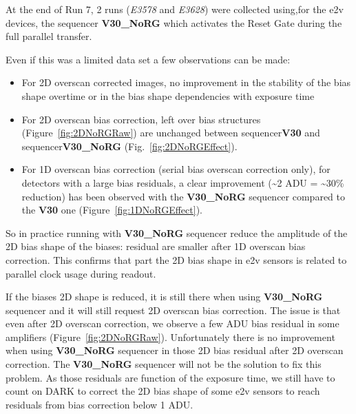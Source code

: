 At the end of Run 7, 2 runs ({\it E3578} and {\it E3628}) were collected using,for the e2v devices, the  sequencer {\bf V30\_NoRG}  which activates the Reset Gate during the full parallel transfer. 

Even if this was a limited data set a few observations can be made: 
\begin{itemize}
    \item For 2D overscan corrected images, no improvement in the stability of the bias shape overtime  or in the bias shape dependencies with exposure time   
    \item For 2D overscan bias correction, left over bias structures (Figure~\ref{fig:2DNoRGRaw}) are unchanged between  sequencer{\bf V30} and sequencer{\bf V30\_NoRG} (Fig.~\ref{fig:2DNoRGEffect}).
    \item For 1D overscan bias correction (serial bias overscan correction only), for detectors with a large  bias residuals, a clear improvement (\textasciitilde2 ADU = \textasciitilde 30\% reduction) has been observed with the {\bf V30\_NoRG} sequencer compared to the {\bf V30} one (Figure~\ref{fig:1DNoRGEffect}). 
\end{itemize}

So in practice running with {\bf V30\_NoRG} sequencer reduce the amplitude of the 2D bias shape of the biases: residual are smaller after 1D overscan bias correction.  This confirms  that part the 2D bias shape in e2v sensors is related to parallel clock usage during readout. 

If the biases 2D shape is reduced, it is still there when using {\bf V30\_NoRG} sequencer and it will still request 2D overscan bias correction. The issue is that even after 2D overscan correction, we observe a few ADU bias residual in some amplifiers (Figure~\ref{fig:2DNoRGRaw}). Unfortunately there is no improvement when using  {\bf V30\_NoRG} sequencer in those 2D bias residual after 2D overscan correction. The {\bf V30\_NoRG} sequencer will not be the solution to fix this problem. As those residuals are function of the exposure time, we still have to count on DARK to correct the 2D bias shape of some e2v sensors to reach residuals from bias correction below 1 ADU. 

